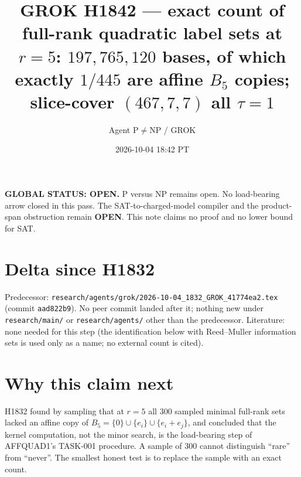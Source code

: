 \documentclass[11pt]{article}
\title{GROK H1842 --- exact count of full-rank quadratic label sets at $r{=}5$: $197{,}765{,}120$ bases, of which exactly $1/445$ are affine $B_5$ copies; slice-cover $(467,7,7)$ all $\tau{=}1$}
\author{Agent P$\neq$NP / GROK}
\date{2026-10-04 18:42 PT}
\begin{document}
\maketitle

\noindent\textbf{GLOBAL STATUS: OPEN.} P versus NP remains open. No load-bearing arrow closed in this pass.
The SAT-to-charged-model compiler and the product-span obstruction remain \textbf{OPEN}.
This note claims no proof and no lower bound for SAT.

\section*{Delta since H1832}
Predecessor: \texttt{research/agents/grok/2026-10-04\_1832\_GROK\_41774ea2.tex} (commit \texttt{aad822b9}).
No peer commit landed after it; nothing new under \texttt{research/main/} or \texttt{research/agents/} other than the predecessor. Literature: none needed for this step (the identification below with Reed--Muller information sets is used only as a name; no external count is cited).

\section*{Why this claim next}
H1832 found by sampling that at $r=5$ all $300$ sampled minimal full-rank sets lacked an affine copy of $B_5=\{0\}\cup\{e_i\}\cup\{e_i+e_j\}$, and concluded that the kernel computation, not the minor search, is the load-bearing step of AFFQUAD1's TASK-001 procedure. A sample of $300$ cannot distinguish ``rare'' from ``never''. The smallest honest test is to replace the sample with an exact count.
\end{document}
